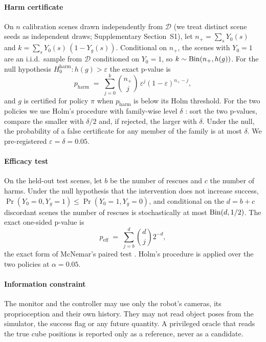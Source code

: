 \paragraph{Harm certificate} On $n$ calibration scenes drawn independently from $\mathcal{D}$ (we treat distinct scene seeds as independent draws; Supplementary Section~S1), let $n_+=\sum_s Y_0(s)$ and $k=\sum_s Y_0(s)\,(1-Y_g(s))$. Conditional on $n_+$, the scenes with $Y_0=1$ are an i.i.d.\ sample from $\mathcal{D}$ conditioned on $Y_0=1$, so $k\sim\operatorname{Bin}(n_+, h(g))$. For the null hypothesis $H_0^{\mathrm{harm}}: h(g)>\varepsilon$ the exact p-value is
\begin{equation}\label{eq:cert}
p_{\mathrm{harm}} \;=\; \sum_{j=0}^{k}\binom{n_+}{j}\,\varepsilon^{j}(1-\varepsilon)^{n_+-j},
\end{equation}
and $g$ is certified for policy $\pi$ when $p_{\mathrm{harm}}$ is below its Holm threshold. For the two policies we use Holm's procedure with family-wise level $\delta$ \cite{holm1979}: sort the two p-values, compare the smaller with $\delta/2$ and, if rejected, the larger with $\delta$. Under the null, the probability of a false certificate for any member of the family is at most $\delta$. We pre-registered $\varepsilon=\delta=0.05$.

\paragraph{Efficacy test} On the held-out test scenes, let $b$ be the number of rescues and $c$ the number of harms. Under the null hypothesis that the intervention does not increase success, $\Pr(Y_0=0,Y_g=1)\le\Pr(Y_0=1,Y_g=0)$, and conditional on the $d=b+c$ discordant scenes the number of rescues is stochastically at most $\operatorname{Bin}(d,1/2)$. The exact one-sided p-value is
\begin{equation}\label{eq:eff}
p_{\mathrm{eff}} \;=\; \sum_{j=b}^{d}\binom{d}{j}2^{-d},
\end{equation}
the exact form of McNemar's paired test \cite{mcnemar1947}. Holm's procedure is applied over the two policies at $\alpha=0.05$.

\paragraph{Information constraint} The monitor and the controller may use only the robot's cameras, its proprioception and their own history. They may not read object poses from the simulator, the success flag or any future quantity. A privileged oracle that reads the true cube positions is reported only as a reference, never as a candidate.

